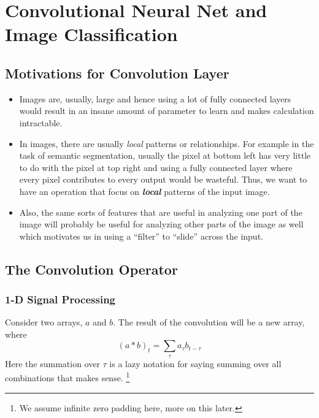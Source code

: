 \documentclass[11pt]{article}
\begin{document}
 










\section{Convolutional Neural Net and Image Classification}
\subsection{Motivations for Convolution Layer}
\begin{itemize}
    \item Images are, usually, large and hence using a lot of fully connected layers would result in an insane amount of parameter to learn and makes calculation intractable.
    \item In images, there are usually \textit{local} patterns or relationships. For example in the task of semantic segmentation, usually the pixel at bottom left has very little to do with the pixel at top right and using a fully connected layer where every pixel contributes to every output would be wasteful. Thus, we want to have an operation that focus on \textit{\textbf{local}} patterns of the input image.
    \item Also, the same sorts of features that are useful in analyzing one part of the image will probably be useful for analyzing other parts of the image as well which motivates us in using a ``filter'' to ``slide'' across the input. 
\end{itemize}

\subsection{The Convolution Operator}
\subsubsection{1-D Signal Processing} Consider two arrays, $a$ and $b$. The result of the convolution will be a new array, where
\begin{equation}
    (a * b)_{t}=\sum_{\tau} a_{\tau} b_{t-\tau}
\end{equation}
Here the summation over $\tau$ is a lazy notation for saying summing over all combinations that makes sense. \footnote{We assume infinite zero padding here, more on this later.}
\end{document}
